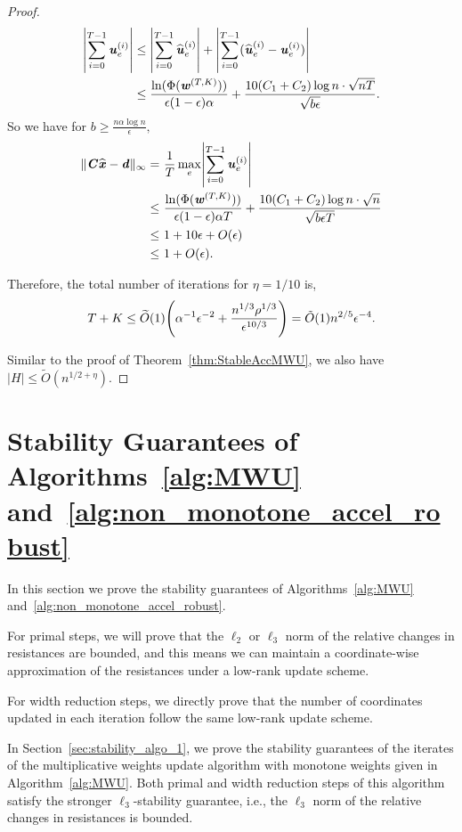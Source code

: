 \documentclass[11pt]{article}
\let\originalleft\left
\let\originalright\right
\renewcommand{\left}{\mathopen{}\mathclose\bgroup\originalleft}
\renewcommand{\right}{\aftergroup\egroup\originalright}
\newcommand\dd{\boldsymbol{\mathit{d}}}
\newcommand\uu{\boldsymbol{\mathit{u}}}
\newcommand\ww{\boldsymbol{\mathit{w}}}
\newcommand\xx{\boldsymbol{\mathit{x}}}
\newcommand\CC{\boldsymbol{\mathit{C}}}
\newcommand\xxhat{\widehat{\xx}}
\newcommand\Otil{\widetilde{O}}
\newcommand{\wh}{\widehat}
\begin{document}
\begin{proof}
\begin{align*}
\left|\sum_{i=0}^{T-1} \uu^{(i)}_e \right|&\leq \left|\sum_{i=0}^{T-1} \wh{\uu}^{(i)}_e \right| 
 + \left|\sum_{i=0}^{T-1} (\wh{\uu}^{(i)}_e - \uu^{(i)}_e)\right|\\
 &\leq \frac{\ln(\Phi(\ww^{(T,K)}))}{\epsilon(1-\epsilon)\alpha} + \frac{10 (C_1 + C_2) \log n \cdot \sqrt{nT}}{\sqrt{b \epsilon}}.
\end{align*}
So we have for $b \geq \frac{n \alpha \log n}{\epsilon},$
\begin{align*}
\|\CC \xxhat - \dd\|_{\infty} = &~ \frac{1}{T} \max_e \left|\sum_{i=0}^{T-1} \uu^{(i)}_e\right| \\
\leq &~ \frac{\ln(\Phi(\ww^{(T,K)}))}{\epsilon(1-\epsilon)\alpha T} + \frac{10 (C_1 + C_2) \log n \cdot \sqrt{n}}{\sqrt{b \epsilon T}}\\
\leq &~ 1+10\epsilon + O(\epsilon)\\
\leq &~ 1 + O(\epsilon).
\end{align*}

Therefore, the total number of iterations for $\eta = 1/10$ is,
\[
T + K \leq \Otil(1) \left( \alpha^{-1}\epsilon^{-2}  + \frac{n^{1/3}\rho^{1/3}}{\epsilon^{10/3}}\right)= \tilde{O}(1) n^{2/5}\epsilon^{-4}.
\]

Similar to the proof of Theorem~\ref{thm:StableAccMWU}, we also have $|H| \leq \Otil(n^{1/2+\eta})$.
\end{proof}




 \section{Stability Guarantees of Algorithms~\ref{alg:MWU} and~\ref{alg:non_monotone_accel_robust}}\label{sec:StabilityMWU}
In this section we prove the stability guarantees of Algorithms~\ref{alg:MWU} and~\ref{alg:non_monotone_accel_robust}. 

For primal steps, we will prove that the $\ell_2$ or $\ell_3$ norm of the relative changes in resistances are bounded, and this means we can maintain a coordinate-wise approximation of the resistances under a low-rank update scheme. 

For width reduction steps, we directly prove that the number of coordinates updated in each iteration follow the same low-rank update scheme.

In Section~\ref{sec:stability_algo_1}, we prove the stability guarantees of the iterates of the multiplicative weights update algorithm with monotone weights given in Algorithm~\ref{alg:MWU}. Both primal and width reduction steps of this algorithm satisfy the stronger $\ell_3$-stability guarantee, i.e., the $\ell_3$ norm of the relative changes in resistances is bounded.
\end{document}
